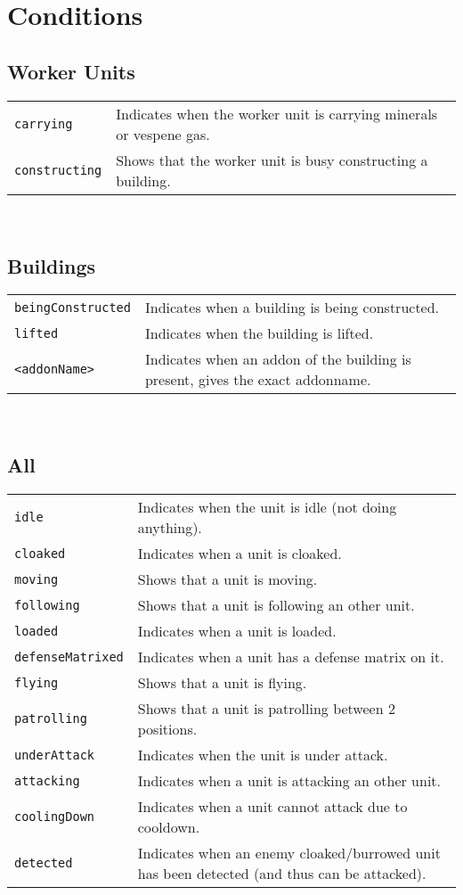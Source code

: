 \section{Conditions}
\label{conditions}

\subsection{Worker Units}
\begin{tabularx}{\textwidth}{lX}
 \verb|carrying| & Indicates when the worker unit is carrying minerals or vespene gas. \\
 \verb|constructing| & Shows that the worker unit is busy constructing a building.
\end{tabularx} \\

\subsection{Buildings}
\begin{tabularx}{\textwidth}{lX}
 \verb|beingConstructed| & Indicates when a building is being constructed. \\
 \verb|lifted| & Indicates when the building is lifted. \\
 \verb|<addonName>| & Indicates when an addon of the building is present, gives the exact addonname.
\end{tabularx} \\

\subsection{All}
\begin{tabularx}{\textwidth}{lX}
 \verb|idle| & Indicates when the unit is idle (not doing anything).\\
 \verb|cloaked| & Indicates when a unit is cloaked.\\
 \verb|moving| & Shows that a unit is moving.\\
 \verb|following| & Shows that a unit is following an other unit.\\
 \verb|loaded| & Indicates when a unit is loaded.\\
 \verb|defenseMatrixed| & Indicates when a unit has a defense matrix on it.\\
 \verb|flying| & Shows that a unit is flying.\\
 \verb|patrolling| & Shows that a unit is patrolling between 2 positions.\\
 \verb|underAttack| & Indicates when the unit is under attack.\\
 \verb|attacking| & Indicates when a unit is attacking an other unit.\\
 \verb|coolingDown| & Indicates when a unit cannot attack due to cooldown.\\
  \verb|detected| & Indicates when an enemy cloaked/burrowed unit has been detected (and thus can be attacked).\\
\end{tabularx} \\


